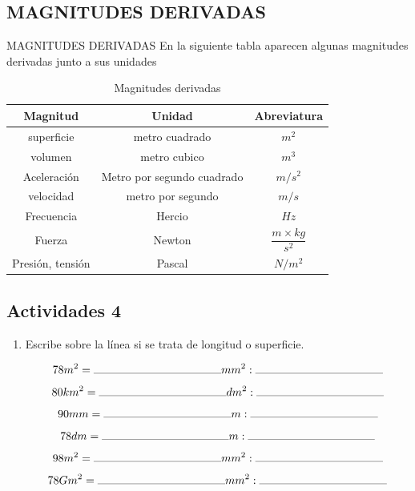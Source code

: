 \documentclass[12pt]{article}
\begin{document}
 \subsection{MAGNITUDES DERIVADAS}
 MAGNITUDES DERIVADAS En la siguiente tabla aparecen algunas magnitudes derivadas junto a sus unidades
 \begin{table}[h]
     \centering
     \begin{tabular}{c|c|c}
          \textbf{Magnitud} & \textbf{Unidad} & \textbf{Abreviatura}  \\\hline
          superficie & metro cuadrado & $m^{2}$\\
          
         volumen & metro cubico & $m^{3}$\\
         
           Aceleración&	Metro por segundo cuadrado&	$m/s^{2}$\\
           
            velocidad & metro por segundo & $m/s$\\
            
            Frecuencia&	Hercio&	$Hz$	\\
            
           Fuerza&	Newton&	 	$\dfrac{m\times kg}{s^{2}}$\\
           
          Presión, tensión&	Pascal&	$N/m^{2}$\\
          \hline
  
     \end{tabular}
     \caption{Magnitudes derivadas}
     \label{tab:Magnitudes derivadas}
 \end{table}
 

 
 


  \begin{tcolorbox}[colback=red!5!white]%
  \centering
   \section*{Actividades 4}
   \end{tcolorbox}
    
    
    \begin{enumerate}
        \item Escribe sobre la línea si se trata de longitud o superficie.\\
    
  \centering
  
 $$78 m^2= \rule{40mm}{0.1mm} mm^2:\rule{40mm}{0.1mm}$$
  $$80 km^2= \rule{40mm}{0.1mm} dm^2:\rule{40mm}{0.1mm}$$
  $$ 90 mm= \rule{40mm}{0.1mm} m:\rule{40mm}{0.1mm}$$
   $$  78 dm= \rule{40mm}{0.1mm} m:\rule{40mm}{0.1mm}$$
     $$  98 m^2= \rule{40mm}{0.1mm} mm^2:\rule{40mm}{0.1mm}$$
   $$   78 Gm^2= \rule{40mm}{0.1mm} mm^2:\rule{40mm}{0.1mm}$$
  \end{enumerate}
 
\end{document}
